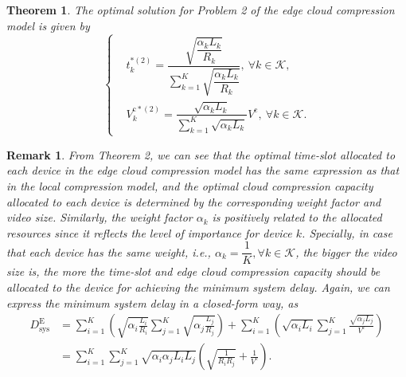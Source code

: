 \documentclass[journal,draftcls,onecolumn,12pt,twoside]{IEEEtran}
\newtheorem{thm}{Theorem}
\newtheorem{rem}{Remark}
\begin{document}
\begin{thm}
The optimal solution for Problem 2 of the edge cloud compression model is given by
\begin{equation}
	\left\{
    \begin{aligned}
        &t_k^{*(2)} = \dfrac{\sqrt{\dfrac{\alpha_k L_k}{R_k}}}{\sum_{k=1}^K{\sqrt{\dfrac{\alpha_k L_k}{R_k}}}},~\forall k \in \mathcal{K},\\
        &V_k^{\text{c}*(2)} = \dfrac{\sqrt{\alpha_k L_k}}{\sum_{k=1}^K{\sqrt{\alpha_k L_k}}}V^{\text{c}},~\forall k \in \mathcal{K}.
	\end{aligned}
    \right. \label{19}
\end{equation}
\end{thm}
\begin{rem}
From Theorem 2, we can see that the optimal time-slot allocated to each device in the edge cloud compression model has the same expression as that in the local compression model, and the optimal cloud compression capacity allocated to each device is determined by the corresponding weight factor and video size. Similarly, the weight factor $\alpha_k$ is positively related to the allocated resources since it reflects the level of importance for device $k$. Specially, in case that each device has the same weight, i.e., $\alpha_k=\dfrac{1}{K}, \forall k \in \mathcal{K}$, the bigger the video size is, the more the time-slot and edge cloud compression capacity should be allocated to the device for achieving the minimum system delay. Again, we can express the minimum system delay in a closed-form way, as
\begin{equation}
	\begin{aligned}
	    D_{\text{sys}}^{\text{E}}
        &= \sum_{i=1}^K{\left( \sqrt{\alpha_i \frac{L_i}{R_i}} \sum_{j=1}^K{ \sqrt{\alpha_j \frac{L_j}{R_j}}} \right)} +
           \sum_{i=1}^K{\left(\sqrt{\alpha_i L_i}\sum_{j=1}^K{\frac{\sqrt{\alpha_j L_j}}{V^{\text{c}}}} \right)}\\
        &= \sum_{i=1}^K{\sum_{j=1}^K{\sqrt{\alpha_i \alpha_j L_i L_j}\left(\sqrt{\frac{1}{R_i R_j}}+\frac{1}{V^{\text{c}}}\right)}}.
	\end{aligned} \label{20}
\end{equation}
\end{rem}
\end{document}
